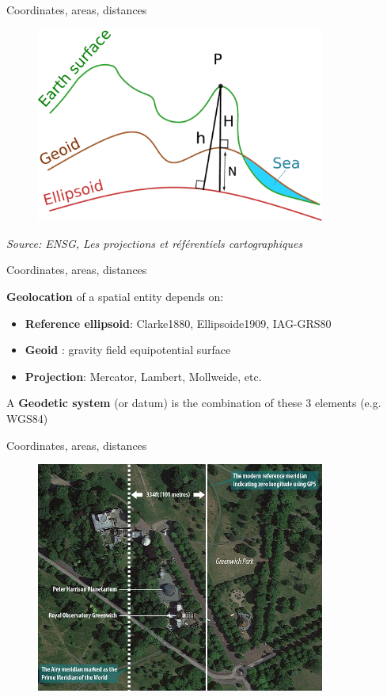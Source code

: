 \begin{frame}{Coordinates, areas, distances}

\begin{figure}
\includegraphics[width=9.5cm]{Geoide_EN.pdf}
\end{figure}

\footnotesize
\emph{Source: ENSG, Les projections et référentiels cartographiques}
\normalsize

\end{frame}


\begin{frame}{Coordinates, areas, distances}

 \textbf{Geolocation} of a spatial entity  depends on:

\begin{itemize}
  \item \textbf{Reference ellipsoid}: Clarke1880, Ellipsoide1909, IAG-GRS80
  \item \textbf{Geoid} : gravity field equipotential surface 
  \item \textbf{Projection}: Mercator, Lambert, Mollweide, etc.
\end{itemize}

 A \textbf{Geodetic system} (or datum) is the combination of these 3 elements (e.g. WGS84)

\end{frame}


\begin{frame}{Coordinates, areas, distances}

\begin{figure}
\includegraphics[width=9.5cm]{Greenwich.jpg}
\end{figure}

\end{frame}


